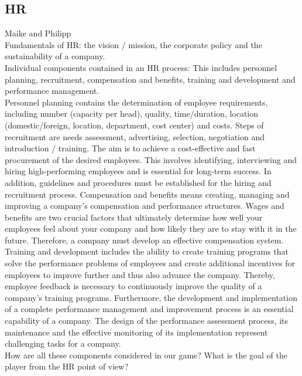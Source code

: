 \documentclass[11pt,titlepage,oneside,openany]{book}
\begin{document}
\subsection{HR}
Maike and Philipp \\
Fundamentals of HR: the vision / mission, the corporate policy and the sustainability of a company.\\
Individual components contained in an HR process:
This includes personnel planning, recruitment, compensation and benefits, training and development and performance management.\\
Personnel planning contains the determination of employee requirements, including number (capacity per head), quality, time/duration, location (domestic/foreign, location, department, cost center) and costs. Steps of recruitment are needs assessment, advertising, selection, negotiation and introduction / training. The aim is to achieve a cost-effective and fast procurement of the desired employees. This involves identifying, interviewing and hiring high-performing employees and is essential for long-term success. In addition, guidelines and procedures must be established for the hiring and recruitment process. Compensation and benefits means creating, managing and improving a company's compensation and performance structures. Wages and benefits are two crucial factors that ultimately determine how well your employees feel about your company and how likely they are to stay with it in the future. Therefore, a company must develop an effective compensation system. Training and development includes the ability to create training programs that solve the performance problems of employees and create additional incentives for employees to improve further and thus also advance the company. Thereby, employee feedback is necessary to continuously improve the quality of a company's training programs. Furthermore, the development and implementation of a complete performance management and improvement process is an essential capability of a company. The design of the performance assessment process, its maintenance and the effective monitoring of its implementation represent challenging tasks for a company.
\\
How are all these components considered in our game? What is the goal of the player from the HR point of view?
\end{document}
